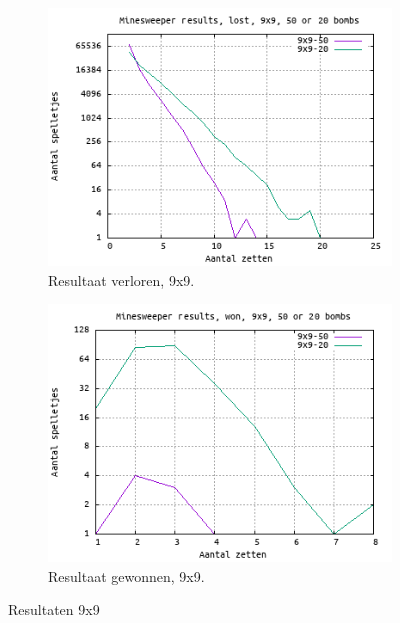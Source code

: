 \documentclass[10pt]{article}
\begin{document}
\hfill
\begin{figure}[H]
  \centering
  \begin{subfigure}{.49\textwidth}
    \centering
    \includegraphics[width=1\linewidth]{plot_9_9_lost}
    \caption{Resultaat verloren, 9x9. }
    \label{fig:plot_9_9_lost}
  \end{subfigure}
  \begin{subfigure}{.49\textwidth}
    \centering
    \includegraphics[width=1\linewidth]{plot_9_9_won}
    \caption{Resultaat gewonnen, 9x9. }
    \label{fig:plot_9_9_won}
  \end{subfigure}
  \caption{Resultaten 9x9}
  \label{fig:plots1}
\end{figure}
\end{document}
